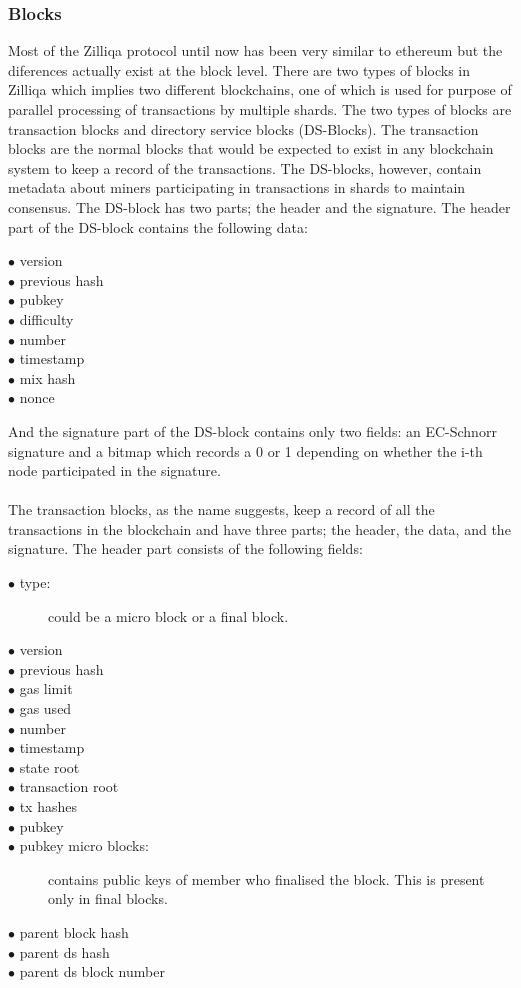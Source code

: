 \documentclass[a4paper,twoside,phd]{BYUPhys}
\begin{document}
\subsubsection{Blocks}
Most of the Zilliqa protocol until now has been very similar to ethereum but the diferences actually exist at the block level. There are two types of blocks in Zilliqa which implies two different blockchains, one of which is used for purpose of parallel processing of transactions by multiple shards. The two types of blocks are transaction blocks and directory service blocks (DS-Blocks). The transaction blocks are the normal blocks that would be expected to exist in any blockchain system to keep a record of the transactions. The DS-blocks, however, contain metadata about miners participating in transactions in shards to maintain consensus. The DS-block has two parts; the header and the signature. The header part of the DS-block contains the following data:
\begin{description}
\item[$\bullet$ version]
\item[$\bullet$ previous hash]
\item[$\bullet$ pubkey]
\item[$\bullet$ difficulty]
\item[$\bullet$ number]
\item[$\bullet$ timestamp]
\item[$\bullet$ mix hash]
\item[$\bullet$ nonce]
\end{description}
And the signature part of the DS-block contains only two fields: an EC-Schnorr signature and a bitmap which records a 0 or 1 depending on whether the i-th node participated in the signature.
\\
\\
The transaction blocks, as the name suggests,  keep a record of all the transactions in the blockchain and have three parts; the header, the data, and the signature. The header part consists of the following fields:
\begin{description}
\item[$\bullet$ type:] could be a micro block or a final block.
\item[$\bullet$ version] 
\item[$\bullet$ previous hash]
\item[$\bullet$ gas limit]
\item[$\bullet$ gas used]
\item[$\bullet$ number]
\item[$\bullet$ timestamp]
\item[$\bullet$ state root]
\item[$\bullet$ transaction root]
\item[$\bullet$ tx hashes]
\item[$\bullet$ pubkey]
\item[$\bullet$ pubkey micro blocks:] contains public keys of member who finalised the block. This is present only in final blocks.
\item[$\bullet$ parent block hash]
\item[$\bullet$ parent ds hash]
\item[$\bullet$ parent ds block number]
\end{description}
\end{document}
